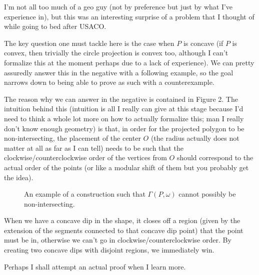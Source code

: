 \documentclass[a5paper, 10pt]{article}
\begin{document}
I'm not all too much of a geo guy (not by preference but just by what I've
experience in), but this was an interesting surprise of a problem that I
thought of while going to bed after USACO.

The key question one must tackle here is the case when \( P \) is concave (if
\( P \) is convex, then trivially the circle projection is convex too, although
I can't formalize this at the moment perhaps due to a lack of experience). We
can pretty assuredly answer this in the negative with a following example, so the goal narrows down to
being able to prove as such with a counterexample.

The reason why we can answer in the negative is contained in Figure 2. The
intuition behind this (intuition is all I really can give at this stage because
I'd need to think a whole lot more on how to actually formalize this; man I
really don't know enough geometry) is that, in order for the projected polygon
to be non-intersecting, the placement of the center \( O \) (the radius
actually does not matter at all as far as I can tell) needs to be such that the
clockwise/counterclockwise order of the vertices from \( O \) should correspond
to the actual order of the points (or like a modular shift of them but you
probably get the idea).

\begin{figure}
    \centering
    \caption{An example of a construction such that \( \Gamma(P, \omega) \) cannot possibly be non-intersecting.}
\end{figure}

When we have a concave dip in the shape, it closes off a region (given by the
extension of the segments connected to that concave dip point) that the point
must be in, otherwise we can't go in clockwise/counterclockwise order. By
creating two concave dips with disjoint regions, we immediately win.

Perhaps I shall attempt an actual proof when I learn more.
\end{document}
